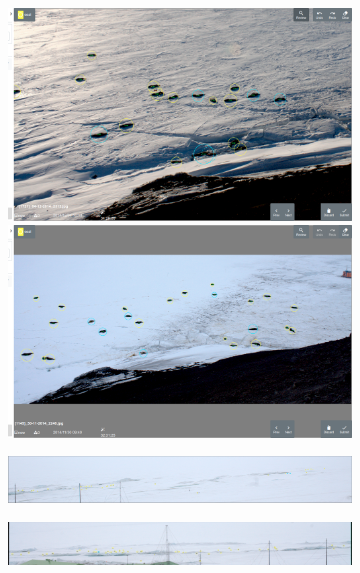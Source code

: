 \begin{figure}[h!]
\centering
\begin{subfigure}[t]{1.0\linewidth}
  \includegraphics[width=0.475\linewidth]{figures/annotation/screenshots/seals_small2.png}
  \hfill
  \includegraphics[width=0.475\linewidth]{figures/annotation/screenshots/seals_small.png}
  \caption{}
\end{subfigure}

\begin{subfigure}[t]{1.0\linewidth}
  \includegraphics[width=1.0\linewidth]{figures/annotation/screenshots/cam_c.png}
\end{subfigure}

\begin{subfigure}[t]{1.0\linewidth}
  \includegraphics[width=1.0\linewidth]{figures/annotation/screenshots/cam_b.png}
  \caption{}
\end{subfigure}



\caption{ }
\label {fig:weddell_images}
\end{figure}






